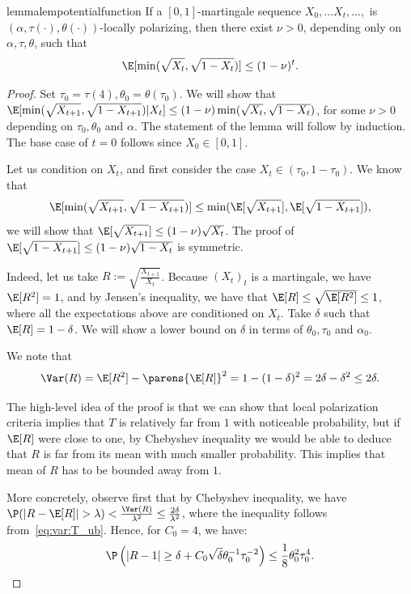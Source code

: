 \documentclass[11pt]{article}
\begin{document}
\begin{restatable}{lemma}{lempotentialfunction}
	\label{lem:potential-function}
	If a $[0,1]$-martingale sequence $X_0, \ldots X_t, \ldots,$ is $(\alpha,\tau(\cdot),\theta(\cdot))$-locally polarizing, then there exist $\nu > 0$, depending only on $\alpha, \tau, \theta$, such that 
	\[\E [\min(\sqrt{X_t}, \sqrt{1-X_t}) ] \leq (1 - \nu)^{t}.\]
\end{restatable}

\begin{proof}
	Set $\tau_0 = \tau(4), \theta_0 = \theta(\tau_0)$.
	We will show that $\E [\min(\sqrt{X_{t+1}}, \sqrt{1-X_{t + 1}}) | X_{t}] \leq (1 - \nu) \min(\sqrt{X_{t}}, \sqrt{1 - X_{t}})$,
	for some $\nu>0$ depending on $\tau_0,\theta_0$ and $\alpha$. The statement of the lemma will follow by induction. The base case of $t=0$ follows since $X_0\in [0,1]$.
	
	
	Let us condition on $X_t$, and first consider the case $X_t \in (\tau_0, 1 - \tau_0)$. We know that
	\[\E [\min(\sqrt{X_{t+1}}, \sqrt{1 - X_{t+1}})] \leq \min(\E[\sqrt{X_{t + 1}}], \E[\sqrt{1 - X_{t + 1}}]),\]
	we will show that $\E[\sqrt{X_{t+1}}] \leq (1 - \nu) \sqrt{X_t}$. The proof of $\E[\sqrt{1 - X_{t+1}}] \leq (1 - \nu)\sqrt{1-X_t}$ is symmetric. 
	
	Indeed, let us take $R := \sqrt{\frac{X_{t+1}}{X_t}}$.
	Because $(X_t)_t$ is a martingale, we have $\E [R^2] = 1$, and by Jensen's inequality, we have that $\E[R] \leq \sqrt{\E[R^2]} \leq 1$, where all the expectations above are conditioned on $X_t$. Take $\delta$ such that $\E[R] = 1 -\delta$. We will show a lower bound on $\delta$ in terms of $\theta_0, \tau_0$ and $\alpha_0$.
	
	We note that
	\begin{equation}
		\label{eq:var:T_ub}
		\Var(R)=\E[R^2]-\parens{\E[R]}^2 = 1-(1-\delta)^2= 2\delta-\delta^2 
		\le 2\delta.
	\end{equation}
	
	The high-level idea of the proof is that we can show that local polarization criteria implies that $T$ is relatively far from $1$ with noticeable probability, but if $\E[R]$ were close to one, by Chebyshev inequality we would be able to deduce that $R$ is far from its mean with much smaller probability. This implies that mean of $R$ has to be bounded away from $1$.
	
	More concretely, observe first that by Chebyshev inequality, we have $\P(|R - \E [R]| > \lambda) < \frac{\Var(R)}{\lambda^2}  
	\leq \frac{2\delta}{\lambda^2}$, where the inequality follows from~\eqref{eq:var:T_ub}.
	Hence, for $C_0=4$, we have: 
	\begin{equation}
		\P\left(|R - 1| \ge \delta + C_0 \sqrt{\delta} \theta_0^{-1} \tau_0^{-2}\right) \leq \frac{1}{8} \theta_0^2 \tau_0^4.
		\label{eq:t-close-to-one}
	\end{equation}
	

\end{proof}
\end{document}
